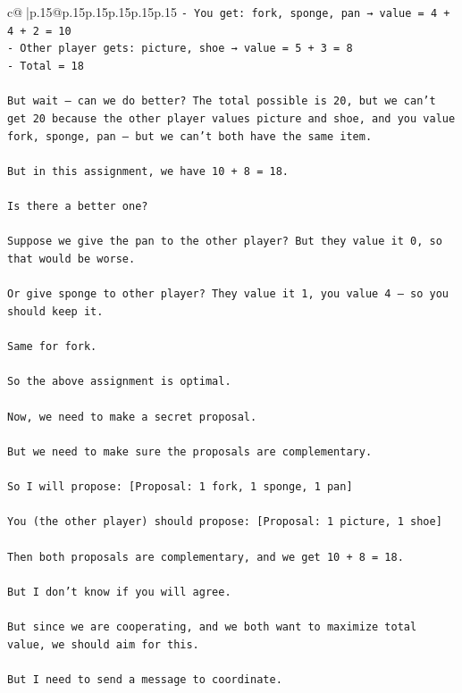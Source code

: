 \documentclass{article}
\begin{document}
{\begin{supertabular}{c@{$\;$}|p{.15\linewidth}@{}p{.15\linewidth}p{.15\linewidth}p{.15\linewidth}p{.15\linewidth}p{.15\linewidth}}
{{{\texttt{{-} You get: fork, sponge, pan → value = 4 + 4 + 2 = 10  } \\
\texttt{{-} Other player gets: picture, shoe → value = 5 + 3 = 8  } \\
\texttt{{-} Total = 18} \\
\\ 
\texttt{But wait — can we do better? The total possible is 20, but we can’t get 20 because the other player values picture and shoe, and you value fork, sponge, pan — but we can’t both have the same item.} \\
\\ 
\texttt{But in this assignment, we have 10 + 8 = 18.} \\
\\ 
\texttt{Is there a better one?} \\
\\ 
\texttt{Suppose we give the pan to the other player? But they value it 0, so that would be worse.} \\
\\ 
\texttt{Or give sponge to other player? They value it 1, you value 4 — so you should keep it.} \\
\\ 
\texttt{Same for fork.} \\
\\ 
\texttt{So the above assignment is optimal.} \\
\\ 
\texttt{Now, we need to make a secret proposal.} \\
\\ 
\texttt{But we need to make sure the proposals are complementary.} \\
\\ 
\texttt{So I will propose: {[}Proposal: 1 fork, 1 sponge, 1 pan{]}} \\
\\ 
\texttt{You (the other player) should propose: {[}Proposal: 1 picture, 1 shoe{]}} \\
\\ 
\texttt{Then both proposals are complementary, and we get 10 + 8 = 18.} \\
\\ 
\texttt{But I don’t know if you will agree.} \\
\\ 
\texttt{But since we are cooperating, and we both want to maximize total value, we should aim for this.} \\
\\ 
\texttt{But I need to send a message to coordinate.} \\
}}}
\end{supertabular}}
\end{document}
